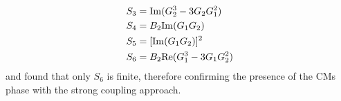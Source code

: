 \documentclass[aps,prx,10pt,twocolumn,floatfix,superscriptaddress,showpacs,numerical,footinbib]{revtex4-1}
\begin{document}
\begin{align}
S_3 &= {\rm Im}(G_2^3-3G_2 G_1^2)  \\
S_4 &= B_2 {\rm Im}(G_1G_2) \\
S_5 &= [{\rm Im}(G_1G_2)]^2 \\
S_6 &= B_2{\rm Re}(G_1^3-3G_1 G_2^2)
\end{align}
and found that only $S_6$ is finite, therefore confirming the presence of the CMs phase with the strong coupling approach. 


\end{document}
